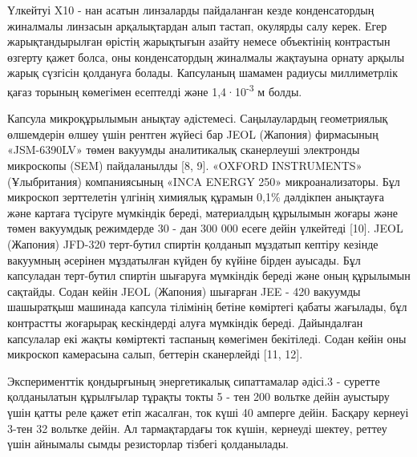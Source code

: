 \begin{multicols}{2}
Үлкейтуі X10 - нан асатын линзаларды пайдаланған кезде конденсатордың
жиналмалы линзасын арқалықтардан алып тастап, окулярды салу керек. Егер
жарықтандырылған өрістің жарықтығын азайту немесе объектінің контрастын
өзгерту қажет болса, оны конденсатордың жиналмалы жақтауына орнату
арқылы жарық сүзгісін қолдануға болады. Капсуланың шамамен радиусы
миллиметрлік қағаз торының көмегімен есептелді және
1,4·10\textsuperscript{-3} м болды.

Капсула микроқұрылымын анықтау әдістемесі. Саңылаулардың геометриялық
өлшемдерін өлшеу үшін рентген жүйесі бар JEOL (Жапония) фирмасының
«JSM-6390LV» төмен вакуумды аналитикалық сканерлеуші электронды
микроскопы (SEM) пайдаланылды {[}8, 9{]}. «OXFORD INSTRUMENTS»
(Ұлыбритания) компаниясының «INCA ENERGY 250» микроанализаторы. Бұл
микроскоп зерттелетін үлгінің химиялық құрамын 0,1\% дәлдікпен анықтауға
және картаға түсіруге мүмкіндік береді, материалдың құрылымын жоғары
және төмен вакуумдық режимдерде 30 - дан 300 000 есеге дейін үлкейтеді
{[}10{]}. JEOL (Жапония) JFD-320 терт-бутил спиртін қолданып мұздатып
кептіру кезінде вакуумның әсерінен мұздатылған күйден бу күйіне бірден
ауысады. Бұл капсуладан терт-бутил спиртін шығаруға мүмкіндік береді
және оның құрылымын сақтайды. Содан кейін JEOL (Жапония) шығарған JEE -
420 вакуумды шашыратқыш машинада капсула тілімінің бетіне көміртегі
қабаты жағылады, бұл контрастты жоғарырақ кескіндерді алуға мүмкіндік
береді. Дайындалған капсулалар екі жақты көміртекті таспаның көмегімен
бекітіледі. Содан кейін оны микроскоп камерасына салып, беттерін
сканерлейді {[}11, 12{]}.

Эксперименттік қондырғының энергетикалық сипаттамалар әдісі.3 - суретте
қолданылатын құрылғылар тұрақты токты 5 - тен 200 вольтке дейін ауыстыру
үшін қатты реле қажет етіп жасалған, ток күші 40 амперге дейін. Басқару
кернеуі 3-тен 32 вольтке дейін. Ал тармақтардағы ток күшін, кернеуді
шектеу, реттеу үшін айнымалы сымды резисторлар тізбегі қолданылады.
\end{multicols}

